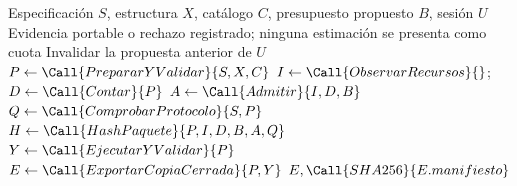 \begin{algorithm}
\caption{Admisión y evidencia de la ruta geométrica TRP}
\begin{algorithmic}[1]
\Require Especificación $S$, estructura $X$, catálogo $C$, presupuesto propuesto $B$, sesión $U$
\Ensure Evidencia portable o rechazo registrado; ninguna estimación se presenta como cuota
\State Invalidar la propuesta anterior de $U$
\State $P \gets \Call{PrepararYValidar}{S,X,C}$
\State $I \gets \Call{ObservarRecursos}{}$; $D \gets \Call{Contar}{P}$
\State $A \gets \Call{Admitir}{I,D,B}$
 \State \Return {} \EndIf
\State $Q \gets \Call{ComprobarProtocolo}{S,P}$
\State \Return {}
\EndIf
\State $H \gets \Call{HashPaquete}{P,I,D,B,A,Q}$
\State {}
 \State \Return {} \EndIf
\State {}
\State {}
\State {}
\State {}
\State $Y \gets \Call{EjecutarYValidar}{P}$
\State {}
\State $E \gets \Call{ExportarCopiaCerrada}{P,Y}$
\State \Return $E,\Call{SHA256}{E.manifiesto}$
\end{algorithmic}
\end{algorithm}
